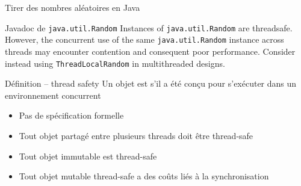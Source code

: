 
\begingroup

\begin{frame}[fragile]{Tirer des nombres aléatoires en Java}

  \begin{shadequote}{Javadoc de \lstinline{java.util.Random}}
    Instances of \lstinline{java.util.Random} are threadsafe.
    However, the concurrent use of the same \lstinline{java.util.Random}
    instance across threads may encounter contention and consequent poor performance.
    Consider instead using \lstinline{ThreadLocalRandom} in multithreaded designs.
  \end{shadequote}

  \begin{block}{Définition -- thread safety}
    Un objet est  s'il a été conçu pour s'exécuter dans un environnement concurrent

    \begin{itemize}
    \item Pas de spécification formelle
    \item Tout objet partagé entre plusieurs threads doit être thread-safe
    \item Tout objet immutable est thread-safe
    \item Tout objet mutable thread-safe a des coûts liés à la synchronisation
    \end{itemize}
  \end{block}

\end{frame}

\endgroup
\endinput
